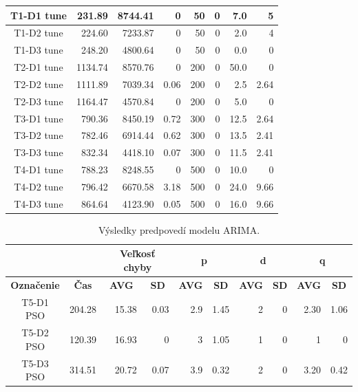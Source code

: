 \documentclass[a4paper,slovak,12pt,appendix]{article}
\begin{document}
\begin{appendices}
\begin{table}[!ht]
\begin{tabular}{|c|r|r|r|r|r|r|r|}
		T1-D1 tune		&		231.89		&		8744.41			&		0		&		50			&		0			&		7.0			&		5 		 	\\ \hline
		T1-D2 tune		&		224.60		&		7233.87			&		0		&		50			&		0			&		2.0			&		4		 	 	\\ \hline
		T1-D3 tune		&		248.20		&		4800.64			&		0		&		50			&		0			&		0.0			&		0 	 		\\ \hline

		T2-D1 tune		&		1134.74		&		8570.76			&		0				&		200			&		0			&		50.0		&		0 	 	\\ \hline
		T2-D2 tune		&		1111.89		&		7039.34			&		0.06		&		200			&		0			&		2.5			&		2.64 	\\ \hline
		T2-D3 tune		&		1164.47		&		4570.84			&		0				&		200			&		0			&		5.0			&		0 	 	\\ \hline

		T3-D1 tune		&		790.36		&		8450.19			&		0.72		&		300			&		0			&		12.5		&		2.64 	 \\ \hline
		T3-D2 tune		&		782.46		&		6914.44			&		0.62		&		300			&		0			&		13.5		&		2.41 	 \\ \hline
		T3-D3 tune		&		832.34		&		4418.10			&		0.07		&		300			&		0			&		11.5		&		2.41 	 \\ \hline

		T4-D1 tune		&		788.23		&		8248.55			&		0				&		500			&		0			&		10.0		&		0 	 		\\ \hline
		T4-D2 tune		&		796.42		&		6670.58			&		3.18		&		500			&		0			&		24.0		&		9.66 	 	\\ \hline
		T4-D3 tune		&		864.64		&		4123.90			&		0.05		&		500			&		0			&		16.0		&		9.66 	 	\\ \hline

  \end{tabular}
\end{table}
\newpage

\begin{table}[!ht]
  \centering
  \caption{Výsledky predpovedí modelu ARIMA.}
  \label{tab-test-arima-result}
  \begin{tabular}{|c|r|r|r|r|r|r|r|r|r|}
    \hline
		\multicolumn{2}{|c|}{}									&			\multicolumn{2}{|c|}{\textbf{Veľkosť chyby}}		&					\multicolumn{2}{|c|}{\textbf{p}}				&			\multicolumn{2}{|c|}{\textbf{d}}				&			\multicolumn{2}{|c|}{\textbf{q}} 			\\ \hline
		\multicolumn{1}{|c|}{\textbf{Označenie}}  &		\multicolumn{1}{|c|}{\textbf{Čas}}  	&						\multicolumn{1}{|c|}{\textbf{AVG}}  &   \multicolumn{1}{|c|}{\textbf{SD}}							&								\multicolumn{1}{|c|}{\textbf{AVG}}  &   \multicolumn{1}{|c|}{\textbf{SD}}			&						\multicolumn{1}{|c|}{\textbf{AVG}}  &   \multicolumn{1}{|c|}{\textbf{SD}} 	 	&						\multicolumn{1}{|c|}{\textbf{AVG}}  &   \multicolumn{1}{|c|}{\textbf{SD}}		\\ \hline
		T5-D1 PSO		&		204.28	&	15.38		&	0.03	&	2.9	&	1.45	&	2	&	0	&	2.30	&	1.06	\\ \hline
		T5-D2 PSO		&		120.39	&	16.93		&	0			&	3		&	1.05	&	1	&	0	&	1			&	0			\\ \hline
		T5-D3 PSO		&		314.51	&	20.72		&	0.07	&	3.9	&	0.32	&	2	&	0	&	3.20	&	0.42	\\ \hline


\end{tabular}
\end{table}
\end{appendices}
\end{document}

